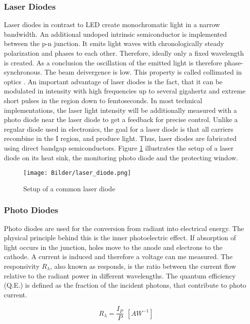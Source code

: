 \subsubsection{Laser Diodes}
Laser diodes in contrast to LED create monochromatic light in a narrow bandwidth. An additional undoped intrinsic semiconductor is implemented between the p-n junction. It emits light waves with  chronologically steady polarization and phases to each other. Therefore, ideally only a fixed wavelength is created. As a conclusion the oscillation of the emitted light is therefore phase-synchronous. The beam deivergence is low. This property is called collimated in optics \cite{thompson1980physics}. An important advantage of laser diodes is the fact, that it can be modulated in intensity with high frequencies up to several gigahertz and extreme short pulses in the region down to femtoseconds. In most technical implementations, the laser light intensity will be additionally measured with a photo diode near the laser diode to get a feedback for precise control. Unlike a regular diode used in electronics, the goal for a laser diode is that all carriers recombine in the I region, and produce light. Thus, laser diodes are fabricated using direct bandgap semiconductors. Figure \ref{fig:laserdiode} illustrates the setup of a laser diode on its heat sink, the monitoring photo diode and the protecting window.

\begin{figure} [!h]
	\centering
	\texttt{[image: Bilder/laser\_diode.png]}
	\caption{Setup of a common laser diode \cite{newport}}
	\label{fig:laserdiode}
\end{figure}

\subsubsection{Photo Diodes} 
Photo diodes are used for the conversion from radiant into electrical energy. The physical principle behind this is the inner photoelectric effect. If absorption of light occurs in the junction, holes move to the anode and electrons to the cathode. A current is induced and therefore a voltage can me measured. The responsivity $R_\lambda$, also known as responds, is the ratio between the current flow relative to the radiant power in different wavelengths. The quantum efficiency (Q.E.) is defined as the fraction of the incident photons, that contribute to photo current.

\begin{equation}
R_\lambda = \frac{I_P}{P} ~~ [A W^{-1}]
\end{equation}

